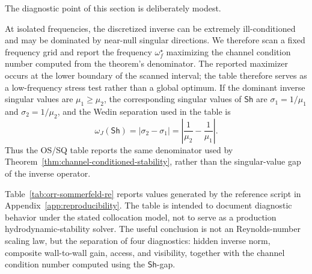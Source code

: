 \documentclass[review]{siamart220329}
\theoremstyle{definition}
\theoremstyle{remark}
\newcommand{\Sh}{\mathsf{Sh}}
\begin{document}
The diagnostic point of this section is deliberately modest.

At isolated
frequencies, the discretized inverse can be extremely ill-conditioned and may be
dominated by near-null singular directions. We therefore scan a fixed frequency
grid and report the frequency $\omega_f^\star$ maximizing the channel condition
number computed from the theorem's denominator. The reported maximizer occurs at the lower boundary of the scanned interval; the table therefore serves as a low-frequency stress test rather than a global optimum. If the dominant inverse singular
values are $\mu_1\geq\mu_2$, the corresponding singular values of $\Sh$ are
$\sigma_1=1/\mu_1$ and $\sigma_2=1/\mu_2$, and the Wedin separation used in the
table is
\begin{equation}
    \omega_J(\Sh)=|\sigma_2-\sigma_1|
    =\left|\frac{1}{\mu_2}-\frac{1}{\mu_1}\right|.
    \label{eq:os-wedin-gap}
\end{equation}
Thus the OS/SQ table reports the same denominator used by
Theorem~\ref{thm:channel-conditioned-stability}, rather than the
singular-value gap of the inverse operator.

Table~\ref{tab:orr-sommerfeld-re} reports values generated by the reference
script in Appendix~\ref{app:reproducibility}. The table is intended to document
diagnostic behavior under the stated collocation model, not to serve as a
production hydrodynamic-stability solver. The useful conclusion is not an
Reynolds-number scaling law, but the separation of four diagnostics: hidden inverse
norm, composite wall-to-wall gain, access, and visibility, together with the
channel condition number computed using the $\Sh$-gap.
\end{document}
